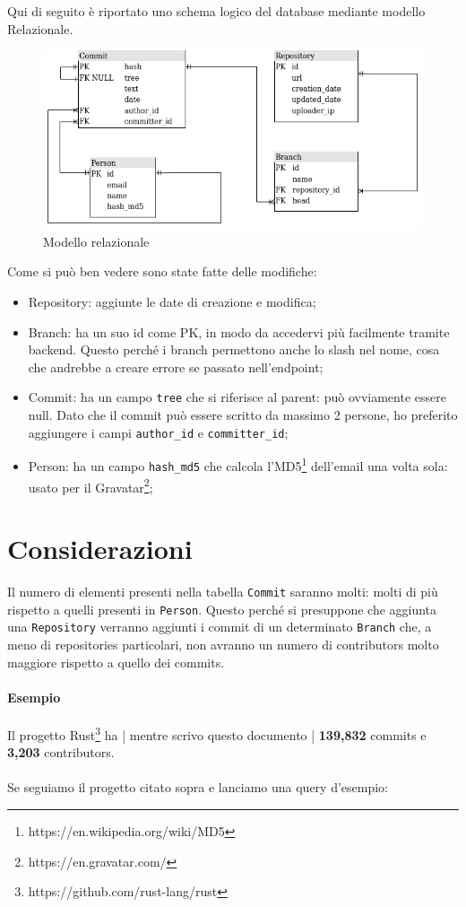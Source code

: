 Qui di seguito è riportato uno schema logico del database mediante modello Relazionale.
\begin{figure}[htp]
\centering
\includegraphics[scale=0.70]{data/relation.png}
\caption{Modello relazionale}
\label{}
\end{figure}

Come si può ben vedere sono state fatte delle modifiche:
\begin{itemize}
\item Repository: aggiunte le date di creazione e modifica;
\item Branch: ha un suo id come PK, in modo da accedervi più facilmente tramite backend. Questo perché i branch permettono anche lo slash nel nome, cosa che andrebbe a creare errore se passato nell'endpoint;
\item Commit: ha un campo \verb|tree| che si riferisce al parent: può ovviamente essere null. Dato che il commit può essere scritto da massimo 2 persone, ho preferito aggiungere i campi \verb|author_id| e \verb|committer_id|;
\item Person: ha un campo \verb|hash_md5| che calcola l'MD5\footnote{https://en.wikipedia.org/wiki/MD5} dell'email una volta sola: usato per il Gravatar\footnote{https://en.gravatar.com/};
\end{itemize}

\section{Considerazioni}
Il numero di elementi presenti nella tabella \verb|Commit| saranno molti: molti di più rispetto a quelli presenti in \verb|Person|. Questo perché si presuppone che aggiunta una \verb|Repository| verranno aggiunti i commit di un determinato \verb|Branch| che, a meno di repositories particolari, non avranno un numero di contributors molto maggiore rispetto a quello dei commits.
\paragraph{Esempio} Il progetto Rust\footnote{https://github.com/rust-lang/rust} ha | mentre scrivo questo documento | \textbf{139,832} commits e \textbf{3,203} contributors.\\\\
\noindent
Se seguiamo il progetto citato sopra e lanciamo una query d'esempio:
